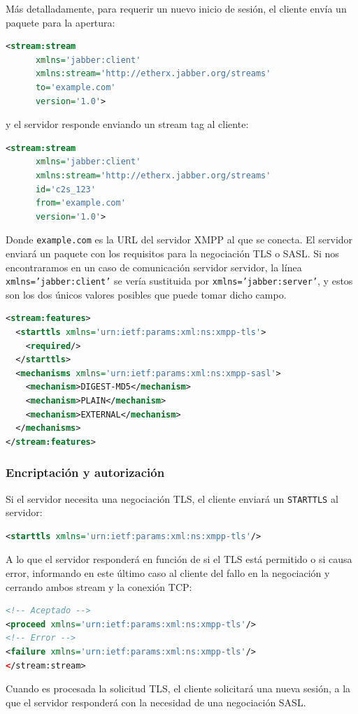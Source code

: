 \documentclass[a4paper, 11pt]{article} %
\begin{document}
      Más detalladamente, para requerir un nuevo inicio de sesión, el cliente envía un paquete para la apertura:
      \begin{lstlisting}[language=XML] 
<stream:stream 
	  xmlns='jabber:client'
	  xmlns:stream='http://etherx.jabber.org/streams'
	  to='example.com' 
	  version='1.0'>
      \end{lstlisting}
      y el servidor responde enviando un stream tag al cliente:
      \begin{lstlisting}[language=XML] 
<stream:stream
	  xmlns='jabber:client'
	  xmlns:stream='http://etherx.jabber.org/streams'
	  id='c2s_123'
	  from='example.com'
	  version='1.0'>
      \end{lstlisting}    
      Donde \texttt{example.com} es la URL del servidor XMPP al que se conecta. El servidor
      enviará un paquete con los requisitos para la negociación TLS o SASL. Si nos encontraramos en un caso de 
      comunicación servidor servidor, la línea \texttt{xmlns='jabber:client'} se vería sustituida por 
      \texttt{xmlns='jabber:server'}, y estos son los dos únicos valores posibles que puede tomar dicho campo.
      \begin{lstlisting}[language=XML]
<stream:features> 
  <starttls xmlns='urn:ietf:params:xml:ns:xmpp-tls'>    
    <required/>  
  </starttls>  
  <mechanisms xmlns='urn:ietf:params:xml:ns:xmpp-sasl'>    
    <mechanism>DIGEST-MD5</mechanism>    
    <mechanism>PLAIN</mechanism>   
    <mechanism>EXTERNAL</mechanism>  
  </mechanisms> 
</stream:features>
      \end{lstlisting}

  \subsubsection{Encriptación y autorización}
    Si el servidor necesita una negociación TLS, el cliente enviará un \texttt{STARTTLS} al servidor:
    \begin{lstlisting}[language=XML]
<starttls xmlns='urn:ietf:params:xml:ns:xmpp-tls'/>    
    \end{lstlisting}
    A lo que el servidor responderá en función de si el TLS está permitido o si causa error, informando en
    este último caso al cliente del fallo en la negociación y cerrando ambos stream y la conexión TCP:
    \begin{lstlisting}[language=XML]
<!-- Aceptado -->
<proceed xmlns='urn:ietf:params:xml:ns:xmpp-tls'/> 
<!-- Error -->
<failure xmlns='urn:ietf:params:xml:ns:xmpp-tls'/> 
</stream:stream>
    \end{lstlisting}
    Cuando es procesada la solicitud TLS, el cliente solicitará una nueva sesión, a la que el servidor
    responderá con la necesidad de una negociación SASL.
\end{document}
